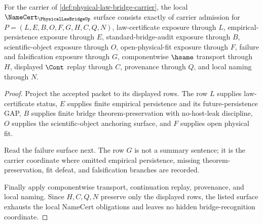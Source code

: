 \begin{theorem}
\label{thm:physical-law-bridge-namecert-surface}
For the carrier of \autoref{def:physical-law-bridge-carrier}, the local $\NameCert_{\PhysicalLawBridgeUp}$ surface consists exactly of carrier admission for $P=(L,E,B,O,F,G,H,C,Q,N)$, law-certificate exposure through $L$, empirical-persistence exposure through $E$, standard-bridge-audit exposure through $B$, scientific-object exposure through $O$, open-physical-fit exposure through $F$, failure and falsification exposure through $G$, componentwise $\hsame$ transport through $H$, displayed $\Cont$ replay through $C$, provenance through $Q$, and local naming through $N$.
\end{theorem}
\begin{proof}
Project the accepted packet to its displayed rows. The row $L$ supplies law-certificate status, $E$ supplies finite empirical persistence and its future-persistence GAP, $B$ supplies finite bridge theorem-preservation with no-host-leak discipline, $O$ supplies the scientific-object anchoring surface, and $F$ supplies open physical fit.

Read the failure surface next. The row $G$ is not a summary sentence; it is the carrier coordinate where omitted empirical persistence, missing theorem-preservation, fit defeat, and falsification branches are recorded.

Finally apply componentwise transport, continuation replay, provenance, and local naming. Since $H,C,Q,N$ preserve only the displayed rows, the listed surface exhausts the local NameCert obligations and leaves no hidden bridge-recognition coordinate.
\end{proof}

